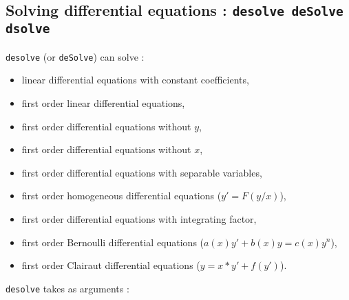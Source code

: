 \documentclass[a4paper,11pt]{book}
\begin{document}
\subsection{Solving differential equations : {\tt desolve deSolve \\
dsolve}}
{\tt desolve} (or {\tt deSolve}) can solve :
\begin{itemize}
\item linear differential equations with constant coefficients,
\item first order linear differential equations,
\item first order differential equations without $y$,
\item first order differential equations without $x$,
\item first order differential equations with separable variables,
\item first order homogeneous differential equations ($y'=F(y/x)$),
\item first order differential equations with integrating factor,
\item first order Bernoulli differential equations ($a(x)y'+b(x)y=c(x)y^n$),
\item first order Clairaut differential equations ($y=x*y'+f(y')$).
\end{itemize}
{\tt desolve} takes as arguments : 
\end{document}

